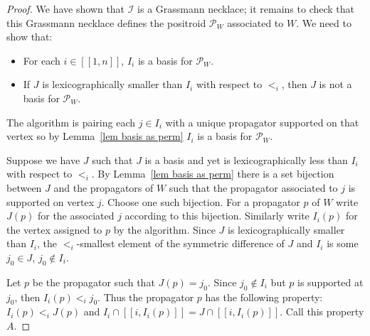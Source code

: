 \documentclass[11pt]{article}
\newcommand{\II}{\mathcal{I}}
\newcommand{\PP}{\mathcal{P}}
\newcommand{\interval}[2]{[\![#1,#2]\!]}
\theoremstyle{remark}
\theoremstyle{definition}
\begin{document}
\begin{proof}
\medskip

We have shown that $\II$ is a Grassmann necklace; it remains to check that this Grassmann necklace defines the positroid $\PP_W$ associated to $W$.  We need to show that:
\begin{itemize}
\item For each $i \in \interval{1}{n}$, $I_i$ is a basis for $\PP_W$.
\item If $J$ is lexicographically smaller than $I_i$ with respect to $<_i$, then $J$ is not a basis for $\PP_W$.
\end{itemize}
The algorithm is pairing each $j \in I_i$ with a unique propagator supported on that vertex so by Lemma~\ref{lem basis as perm} $I_i$ is a basis for $\PP_W$.


Suppose we have $J$ such that $J$ is a basis and yet is lexicographically less than $I_i$ with respect to $<_i$.  By Lemma~\ref{lem basis as perm} there is a set bijection between $J$ and the propagators of $W$ such that the propagator associated to $j$ is supported on vertex $j$.  Choose one such bijection.  For a propagator $p$ of $W$ write $J(p)$ for the associated $j$ according to this bijection.  Similarly write $I_i(p)$ for the vertex assigned to $p$ by the algorithm.  Since $J$ is lexicographically smaller than $I_i$, the $<_i$-smallest element of the symmetric difference of $J$ and $I_i$ is some $j_0\in J$, $j_0 \not\in I_i$.

Let $p$ be the propagator such that $J(p)=j_0$.  Since $j_0\not\in I_i$ but $p$ is supported at $j_0$, then $I_i(p) <_i j_0$.  Thus the propagator $p$ has the following property: $I_i(p) <_i J(p)$ and $I_i\cap \interval{i}{I_i(p)} = J\cap \interval{i}{I_i(p)}$.  Call this property $A$.


\end{proof}
\end{document}

